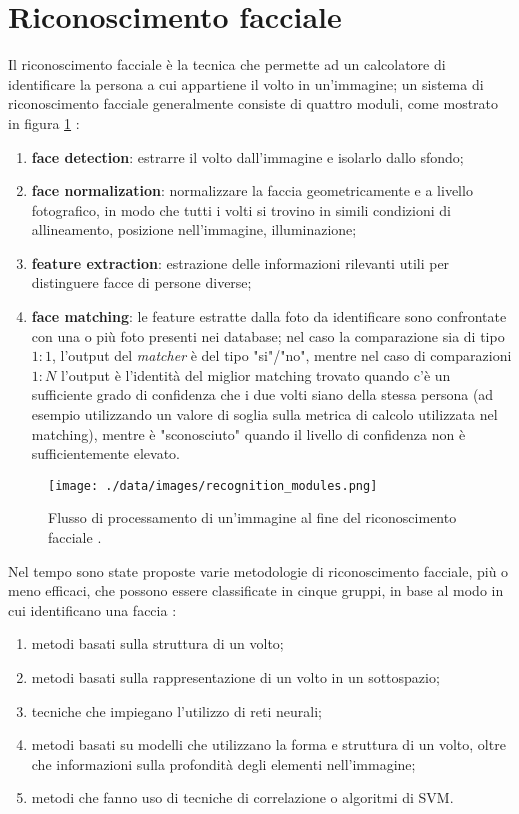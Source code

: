 \section{Riconoscimento facciale}
Il riconoscimento facciale è la tecnica che permette ad un calcolatore di identificare la persona a cui appartiene il volto in un'immagine; un sistema di riconoscimento facciale generalmente consiste di quattro moduli, come mostrato in figura \ref{recognition_modules} \cite{jain2011handbook}:
\begin{enumerate}
	\item \textbf{face detection}: estrarre il volto dall'immagine e isolarlo dallo sfondo;
	\item \textbf{face normalization}: normalizzare la faccia geometricamente e a livello fotografico, in modo che tutti i volti si trovino in simili condizioni di allineamento, posizione nell'immagine, illuminazione;
	\item \textbf{feature extraction}: estrazione delle informazioni rilevanti utili per distinguere facce di persone diverse;
	\item \textbf{face matching}: le feature estratte dalla foto da identificare sono confrontate con una o più foto presenti nei database; nel caso la comparazione sia di tipo $1:1$, l'output del \textit{matcher} è del tipo "si"/"no", mentre nel caso di comparazioni $1:N$ l'output è l'identità del miglior matching trovato quando c'è un sufficiente grado di confidenza che i due volti siano della stessa persona (ad esempio utilizzando un valore di soglia sulla metrica di calcolo utilizzata nel matching), mentre è "sconosciuto" quando il livello di confidenza non è sufficientemente elevato. 
\end{enumerate}
\begin{figure}
	\centering
	\texttt{[image: ./data/images/recognition\_modules.png]}
	\caption{Flusso di processamento di un'immagine al fine del riconoscimento facciale \cite{jain2011handbook}.}
	\label{recognition_modules}
\end{figure}


 Nel tempo sono state proposte varie metodologie di riconoscimento facciale, più o meno efficaci, che possono essere classificate in cinque gruppi, in base al modo in cui identificano una faccia \cite{datta2015face}:
\begin{enumerate}
	\item metodi basati sulla struttura di un volto;
	\item metodi basati sulla rappresentazione di un volto in un sottospazio;
	\item tecniche che impiegano l'utilizzo di reti neurali;
	\item metodi basati su modelli che utilizzano la forma e struttura di un volto, oltre che informazioni sulla profondità degli elementi nell'immagine;
	\item metodi che fanno uso di tecniche di correlazione o algoritmi di SVM.
\end{enumerate}

